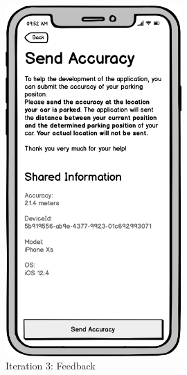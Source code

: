 \begin{figure}[H]
\begin{minipage}[b]{0.45\textwidth}
    \includegraphics[width=0.6\textwidth]{images/UI/Iteration3-Feedback.png}
    \caption{Iteration 3: Feedback}
    \label{fig:i3-feedback}
  \end{minipage}
\end{figure}

